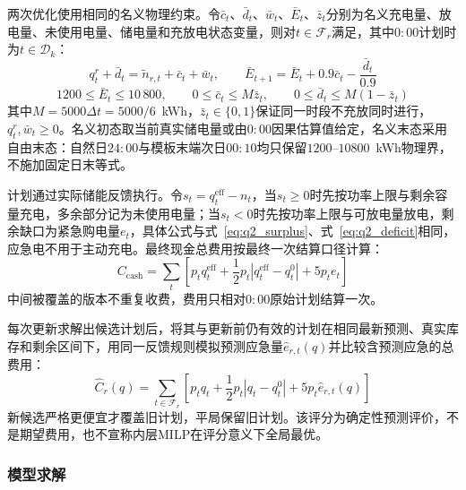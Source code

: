 \documentclass[12pt,a4paper]{ctexart}
\theoremstyle{definition}
\theoremstyle{plain}
\theoremstyle{remark}
\begin{document}
两次优化使用相同的名义物理约束。令$\bar{c}_t$、$\bar{d}_t$、$\bar{w}_t$、$\bar{E}_t$、$\bar{z}_t$分别为名义充电量、放电量、未使用电量、储电量和充放电状态变量，则对$t\in\mathcal{F}_r$满足，其中$0{:}00$计划时为$t\in\mathcal{D}_k$：
\begin{equation}
  q_t^{r} + \bar{d}_t = \widetilde{n}_{r,t} + \bar{c}_t + \bar{w}_t, \qquad
  \bar{E}_{t+1} = \bar{E}_t + 0.9\bar{c}_t - \frac{\bar{d}_t}{0.9}
  \label{eq:q3_balance}
\end{equation}
\begin{equation}
  1200 \leq \bar{E}_t \leq 10\,800, \qquad
  0 \leq \bar{c}_t \leq M\bar{z}_t, \qquad
  0 \leq \bar{d}_t \leq M(1-\bar{z}_t)
  \label{eq:q3_physical}
\end{equation}
\noindent 其中$M=5000\Delta t=5000/6$~kWh，$\bar{z}_t\in\{0,1\}$保证同一时段不充放同时进行，$q_t^{r},\bar{w}_t\geq0$。名义初态取当前真实储电量或由$0{:}00$因果估算值给定，名义末态采用自由末态：自然日$24{:}00$与模板末端次日$00{:}10$均只保留$1200$--$10800$~kWh物理界，不施加固定日末等式。

计划通过实际储能反馈执行。令$s_t=q_t^{\mathrm{eff}}-n_t$，当$s_t\geq0$时先按功率上限与剩余容量充电，多余部分记为未使用电量；当$s_t<0$时先按功率上限与可放电量放电，剩余缺口为紧急购电量$e_t$，具体公式与式~\eqref{eq:q2_surplus}、式~\eqref{eq:q2_deficit}相同，应急电不用于主动充电。最终现金总费用按最终一次结算口径计算：
\begin{equation}
  C_{\mathrm{cash}} = \sum_t
  \left[ p_t q_t^{\mathrm{eff}} + \frac{1}{2}p_t\left|q_t^{\mathrm{eff}}-q_t^{0}\right| + 5p_t e_t \right]
  \label{eq:q3_cash}
\end{equation}
\noindent 中间被覆盖的版本不重复收费，费用只相对$0{:}00$原始计划结算一次。

每次更新求解出候选计划后，将其与更新前仍有效的计划在相同最新预测、真实库存和剩余区间下，用同一反馈规则模拟预测应急量$\widehat{e}_{r,t}(q)$并比较含预测应急的总费用：
\begin{equation}
  \widehat{C}_r(q) = \sum_{t\in\mathcal{F}_r}
  \left[ p_t q_t + \frac{1}{2}p_t\left|q_t-q_t^{0}\right| + 5p_t\widehat{e}_{r,t}(q) \right]
  \label{eq:q3_score}
\end{equation}
\noindent 新候选严格更便宜才覆盖旧计划，平局保留旧计划。该评分为确定性预测评价，不是期望费用，也不宣称内层MILP在评分意义下全局最优。

\subsubsection{模型求解}
\end{document}
